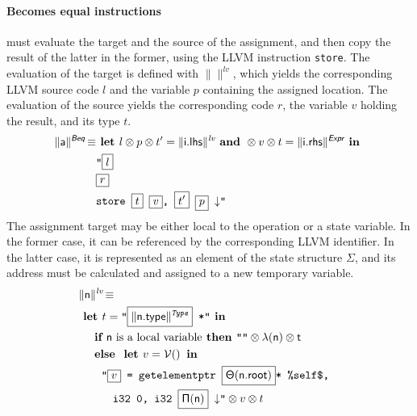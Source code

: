 \documentclass{llncs}
\newcommand{\trad}[2]{\ensuremath{\lVert \textsf{#1} \rVert^{\textit{#2}}}}
\newcommand{\nl}[0]{\ensuremath{\downarrow}}
\DeclareMathOperator{\conc}{\diamond}
\DeclareMathOperator{\isdef}{\equiv}
\DeclareMathOperator{\variable}{\mathcal{V}()}
\newcommand{\llvm}[1]{\texttt{#1}}
\newcommand{\B}[1]{\textsf{#1}}
\newcommand{\IF}[0]{\textbf{ if }}
\newcommand{\ELSE}[0]{\textbf{ else }}
\newcommand{\THEN}[0]{\textbf{ then }}
\newcommand{\LET}[0]{\textbf{ let }}
\newcommand{\IN}[0]{\textbf{ in }}
\newcommand{\AND}[1]{\textbf{ and }}
\newcommand{\PH}[1]{\framebox{$#1$}}
\newcommand{\sep}[0]{\otimes}
\newcommand{\local}[0]{\ensuremath{\sf\lambda}}
\newcommand{\idx}[0]{\ensuremath{\sf\Pi}}
\newcommand{\state}[0]{\ensuremath{\sf\Theta}}
\begin{document}
\paragraph{Becomes equal instructions} must evaluate the target and the source
of the assignment, and then copy the result of the latter in the former, using
the LLVM instruction \llvm{store}. The evaluation of the target is defined with
$\trad{}{lv}$, which yields the corresponding LLVM source code $l$ and the
variable $p$ containing the assigned location. The evaluation of the source
yields the corresponding code $r$, the variable $v$ holding the result, and its
type $t$.
\begin{align*}
\begin{split}
  \trad{a}{\B{Beq}} \isdef
  & \LET l \sep p \sep t'= \trad{i.lhs}{lv} \AND r \sep v \sep t = \trad{i.rhs}{\B{Expr}} \IN \\
  & \llvm{"\PH{l}} \\
  & \llvm{\PH{r}} \\
  & \llvm{store \PH{t} \PH{v}, \PH{t'} \PH{p} \nl"}
\end{split}
\end{align*}
The assignment target may be either local to the operation or a state
variable. In the former case, it can be referenced by the corresponding LLVM
identifier. In the latter case, it is represented as an element of the state
structure $\Sigma$, and its address must be calculated and assigned to a new temporary
variable.
\begin{align*}
\lefteqn{\trad{n}{lv} \isdef} \\
& \LET t = \llvm{"\PH{\trad{\B{n.type}}{Type}} *"} \IN \\
& \quad \IF \mbox{\B{n} is a local variable} \THEN \llvm{""} \sep \local(\B{n}) \sep t \\
& \quad \ELSE \LET v = \variable \IN \\
& \quad \quad \llvm{"\PH{v} = getelementptr \PH{\state(\B{n.root})}* \%self\$,} \\
& \quad \quad \quad \llvm{i32 0, i32 \PH{\idx(\B{n})} \nl"} \sep v \sep t
\end{align*}
\end{document}
